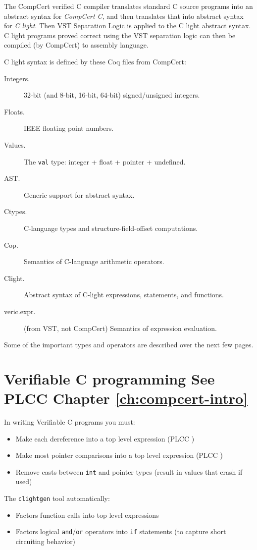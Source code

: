 \documentclass[12pt,fleqn,openany,oneside,showtrims]{memoir}
\newcommand{\ychapter}[2]{\chapter[#1]{#1 \hfill \normalsize #2}}
\begin{document}
The CompCert verified C compiler translates standard C source programs
into an abstract syntax for \emph{CompCert C},
and then translates that into abstract syntax
for \emph{C light}.  
Then VST Separation Logic is applied to the C light abstract syntax.
C light programs proved correct using the VST separation logic
can then be compiled (by CompCert) to assembly language.

C light syntax is defined by these Coq files from CompCert:

\begin{description}
\item[Integers.]  32-bit (and 8-bit, 16-bit, 64-bit) signed/unsigned integers.
\item[Floats.]  IEEE floating point numbers.
\item[Values.]  The \lstinline|val| type: integer + float + pointer + undefined.
\item[AST.]  Generic support for abstract syntax.
\item[Ctypes.]  C-language types and structure-field-offset computations.
\item[Cop.]  Semantics of C-language arithmetic operators.
\item[Clight.]  Abstract syntax of C-light expressions, statements, and functions.
\item[veric.expr.]  (from VST, not CompCert) Semantics of expression evaluation.
\end{description}

Some of the important types and operators are described over the next 
few pages.

\ychapter{Verifiable C programming}{See PLCC Chapter \ref{ch:compcert-intro}}
\label{refcard:verifiable-c}
In writing Verifiable C programs you must:

\begin{itemize}
  \item Make each dereference into a top level expression (PLCC
  )
  \item Make most pointer comparisons into a top level expression (PLCC
  )
  \item Remove casts between \lstinline|int| and pointer types (result in
  values that crash if used)
\end{itemize}

The \lstinline{clightgen} tool automatically:

\begin{itemize}
  \item Factors function calls into top level expressions
  \item Factors logical \lstinline{and}/\lstinline{or} operators into 
\lstinline{if} statements (to capture
  short circuiting behavior)
\end{itemize}
\end{document}
